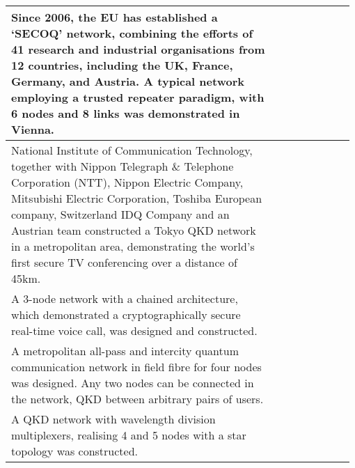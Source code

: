 \begin{table*}[!htbp]
\begin{tabular}{|p{0.755\linewidth}|p{0.22\linewidth}|}
Since 2006, the EU has established a `SECOQ' network, combining the efforts of 41 research and industrial organisations from 12 countries, including the UK, France, Germany, and Austria. A typical network employing a trusted repeater paradigm, with 6 nodes and 8 links was demonstrated in Vienna. & \cite{bib:NJP_11_075001}\\
\hline
National Institute of Communication Technology, together with Nippon Telegraph \& Telephone Corporation (NTT), Nippon Electric Company, Mitsubishi Electric Corporation, Toshiba European company, Switzerland IDQ Company and an Austrian team constructed a Tokyo QKD network in a metropolitan area, demonstrating the world's first secure TV conferencing over a distance of 45km.& \cite{bib:OExp_19_10387}\\
\hline
 A 3-node network with a chained architecture, which demonstrated a cryptographically secure real-time voice call, was designed and constructed.&\cite{bib:OpEx17_6540}\\
 \hline
 A metropolitan all-pass and intercity quantum communication network in field fibre for four nodes was designed. Any two nodes can be connected in the network, QKD between arbitrary pairs of users.&\cite{bib:OpEx_18_27217}\\
 \hline
 A QKD network with wavelength division multiplexers, realising 4 and 5 nodes with a star topology was constructed.&\cite{bib:PLA_372_3957,bib:OL_35_2454}\\
 \hline

\end{tabular}
\end{table*}
